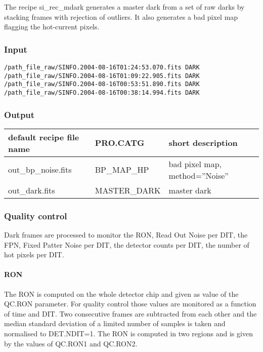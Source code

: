 The recipe si\_rec\_mdark generates a master dark from a set of raw darks by
stacking frames with rejection of outliers. It also generates a bad pixel map 
flagging the hot-current pixels.

\subsubsection{Input}

\begin{verbatim}
/path_file_raw/SINFO.2004-08-16T01:24:53.070.fits DARK
/path_file_raw/SINFO.2004-08-16T01:09:22.905.fits DARK
/path_file_raw/SINFO.2004-08-16T00:53:51.890.fits DARK
/path_file_raw/SINFO.2004-08-16T00:38:14.994.fits DARK
\end{verbatim}


\subsubsection{Output}

\begin{longtable}{|*3{l|}}
\hline
default recipe file name & PRO.CATG      & short description \\
\hline
out\_bp\_noise.fits      & BP\_MAP\_HP   & bad pixel map, method=''Noise'' \\
out\_dark.fits           & MASTER\_DARK  & master dark \\
\hline
\end{longtable}

\subsubsection{Quality control}

Dark frames are processed to monitor the RON, Read Out Noise per DIT, 
the FPN, Fixed Patter Noise per DIT, the detector counts per DIT, 
the number of hot pixels per DIT.



\paragraph{\bf RON}
The RON is computed on the whole detector chip and given as value of the QC.RON
parameter. For quality control those values are monitored as a 
function of time and DIT.
Two consecutive frames are subtracted from each other and the median 
standard deviation of a limited number of samples is taken and normalised to
DET.NDIT=1. The RON is computed in two regions and is given by the values of
QC.RON1 and QC.RON2.

